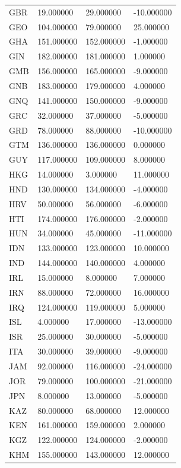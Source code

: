 \begin{tabular}{llll}
GBR & 19.000000 & 29.000000 & -10.000000 \\
GEO & 104.000000 & 79.000000 & 25.000000 \\
GHA & 151.000000 & 152.000000 & -1.000000 \\
GIN & 182.000000 & 181.000000 & 1.000000 \\
GMB & 156.000000 & 165.000000 & -9.000000 \\
GNB & 183.000000 & 179.000000 & 4.000000 \\
GNQ & 141.000000 & 150.000000 & -9.000000 \\
GRC & 32.000000 & 37.000000 & -5.000000 \\
GRD & 78.000000 & 88.000000 & -10.000000 \\
GTM & 136.000000 & 136.000000 & 0.000000 \\
GUY & 117.000000 & 109.000000 & 8.000000 \\
HKG & 14.000000 & 3.000000 & 11.000000 \\
HND & 130.000000 & 134.000000 & -4.000000 \\
HRV & 50.000000 & 56.000000 & -6.000000 \\
HTI & 174.000000 & 176.000000 & -2.000000 \\
HUN & 34.000000 & 45.000000 & -11.000000 \\
IDN & 133.000000 & 123.000000 & 10.000000 \\
IND & 144.000000 & 140.000000 & 4.000000 \\
IRL & 15.000000 & 8.000000 & 7.000000 \\
IRN & 88.000000 & 72.000000 & 16.000000 \\
IRQ & 124.000000 & 119.000000 & 5.000000 \\
ISL & 4.000000 & 17.000000 & -13.000000 \\
ISR & 25.000000 & 30.000000 & -5.000000 \\
ITA & 30.000000 & 39.000000 & -9.000000 \\
JAM & 92.000000 & 116.000000 & -24.000000 \\
JOR & 79.000000 & 100.000000 & -21.000000 \\
JPN & 8.000000 & 13.000000 & -5.000000 \\
KAZ & 80.000000 & 68.000000 & 12.000000 \\
KEN & 161.000000 & 159.000000 & 2.000000 \\
KGZ & 122.000000 & 124.000000 & -2.000000 \\
KHM & 155.000000 & 143.000000 & 12.000000 \\

\end{tabular}
